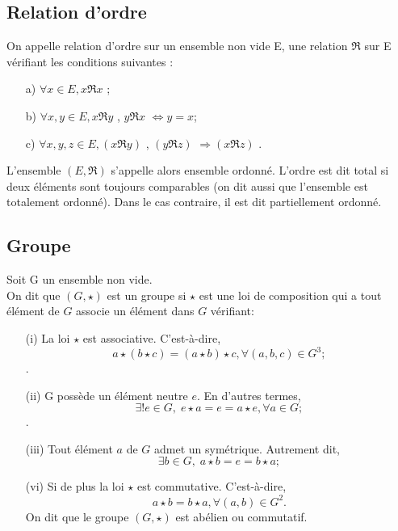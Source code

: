 \subsection{Relation d'ordre}
\begin{madefinition}
	On appelle relation d’ordre sur un ensemble non vide E, une relation
	$\Re $ sur E vérifiant les conditions suivantes :
	\begin{enumerate}
		\item[a)] $\forall x \in E, x\Re x$ ;
		\item[b)] $\forall x,y \in E, x\Re y $ , $y\Re x$ $ \Longleftrightarrow y = x $;
		\item[c)] $\forall x,y,z \in E, (x\Re y)$ , $(y\Re z)$ $\Longrightarrow (x\Re z)$  .
	\end{enumerate}
	L'ensemble $(E, \Re )$ s'appelle alors ensemble ordonné. L'ordre est dit total si deux éléments sont toujours comparables (on dit aussi que l'ensemble est totalement ordonné). Dans le cas contraire, il est dit partiellement ordonné.
\end{madefinition}

\subsection{Groupe}
\begin{madefinition}
	Soit G un ensemble non vide.\\
	On dit que $(G, \star)$ est un groupe si $\star$ est une loi de composition qui a tout élément de $G$ associe un élément dans $G$ vérifiant:
	\begin{enumerate}
		\item[(i)] La loi $\star$ est associative. C’est-à-dire, 
		\[ a\star(b\star c) = (a\star b) \star c, \forall (a,b,c) \in G^3;\].
		\item[(ii)] G possède un élément neutre $e$. En d'autres termes,
		\[ \exists!e \in G,\; e\star a = e =  a\star e, \forall a \in G;\].
		\item[(iii)] Tout élément $a$ de $G$ admet un symétrique. Autrement dit,
		\[ \exists b \in G,\; a\star b = e = b \star a;\]
		\item [(vi)] Si de plus la loi $\star$ est commutative. C’est-à-dire,
		\[ a\star b = b \star a, \forall (a,b) \in G^2.\]
		On dit que le groupe $(G,\star)$ est abélien ou commutatif.
	\end{enumerate}
\end{madefinition}
